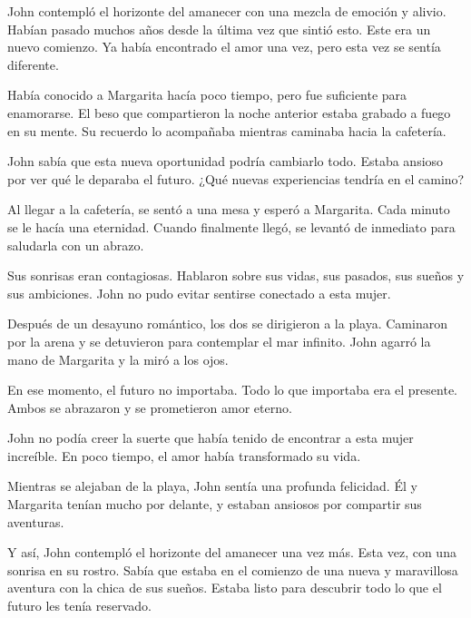 
John contempló el horizonte del amanecer con una mezcla de emoción y alivio. Habían pasado muchos años desde la última vez que sintió esto. Este era un nuevo comienzo. Ya había encontrado el amor una vez, pero esta vez se sentía diferente.

Había conocido a Margarita hacía poco tiempo, pero fue suficiente para enamorarse. El beso que compartieron la noche anterior estaba grabado a fuego en su mente. Su recuerdo lo acompañaba mientras caminaba hacia la cafetería.

John sabía que esta nueva oportunidad podría cambiarlo todo. Estaba ansioso por ver qué le deparaba el futuro. ¿Qué nuevas experiencias tendría en el camino?

Al llegar a la cafetería, se sentó a una mesa y esperó a Margarita. Cada minuto se le hacía una eternidad. Cuando finalmente llegó, se levantó de inmediato para saludarla con un abrazo.

Sus sonrisas eran contagiosas. Hablaron sobre sus vidas, sus pasados, sus sueños y sus ambiciones. John no pudo evitar sentirse conectado a esta mujer.

Después de un desayuno romántico, los dos se dirigieron a la playa. Caminaron por la arena y se detuvieron para contemplar el mar infinito. John agarró la mano de Margarita y la miró a los ojos.

En ese momento, el futuro no importaba. Todo lo que importaba era el presente. Ambos se abrazaron y se prometieron amor eterno.

John no podía creer la suerte que había tenido de encontrar a esta mujer increíble. En poco tiempo, el amor había transformado su vida.

Mientras se alejaban de la playa, John sentía una profunda felicidad. Él y Margarita tenían mucho por delante, y estaban ansiosos por compartir sus aventuras.

Y así, John contempló el horizonte del amanecer una vez más. Esta vez, con una sonrisa en su rostro. Sabía que estaba en el comienzo de una nueva y maravillosa aventura con la chica de sus sueños. Estaba listo para descubrir todo lo que el futuro les tenía reservado.